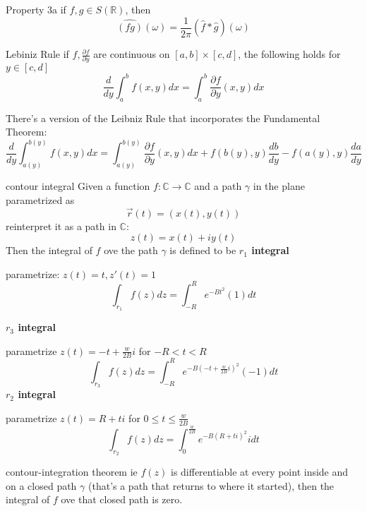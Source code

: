 \documentclass[a4paper]{article}
\newcommand{\C}{\mathbb{C}}
\newcommand{\R}{\mathbb{R}}
\begin{document}
\begin{Corollary}{Property 3a}{}
	if $f,g \in S(\R)$, then \[
		\widehat{\left( fg \right) }\left( \omega \right) = \frac{1}{2\pi}\left( \hat{f} * \hat{g} \right) \left( \omega \right) 
	\] 
\end{Corollary}

\begin{Theorem}{Lebiniz Rule}{}
	if $f, \frac{\partial f}{\partial y}$ are continuous on  $[a,b] \times [c,d]$, the following holds for  $y \in [c,d]$ \[
	\frac{d}{d y} \int_{a}^{b} f(x, y) d x=\int_{a}^{b} \frac{\partial f}{\partial y}(x, y) d x
	\] 
\end{Theorem}

There's a version of the Leibniz Rule that incorporates the Fundamental Theorem: \[
	\frac{d}{dy} \int_{a(y)}^{b(y)} f(x,y) dx = \int_{a(y)}^{b(y)} \frac{\partial f}{\partial y} (x,y) dx + f(b(y),y) \frac{db}{dy}- f(a(y),y)\frac{da}{dy}
\] 
\begin{Definition}{contour integral}{}
	Given a function $f: \C \to  \C$ and a path $\gamma$ in the plane parametrized as  \[
	\vec{r}(t)=(x(t), y(t))
	\] reinterpret it as a path in $\C$:  \[
	z(t) = x(t) + iy(t)
	\] Then the integral of $f$ ove the path  $\gamma$ is defined to be 
\tcblower
\textbf{$r_1$ integral}

parametrize: $z(t) = t, z'(t) = 1$
	\[
	\int_{r_1} f(z) dz = \int_{-R}^{R} e ^{-Bt^2} (1) dt
	\] 

\textbf{$r_3$ integral}

parametrize $z(t) = -t + \frac{w}{2B} i$ for $-R <t <R$
 \[
	 \int_{r_3} f(z) dz = \int_{-R}^R e^{-B(-t + \frac{w}{2B}i)^2 }(-1) dt 
\] 
\textbf{$r_2$ integral}

parametrize $z(t) = R+ti$ for  $0 \le t \le  \frac{w}{2B}$ 
\[
	\int_{r_2} f(z) dz = \int_0^{\frac{w}{2B}} e^{-B(R+ti)^2} i dt
\]
\end{Definition}


\begin{Theorem}{contour-integration theorem}
	ie $f(z)$ is differentiable at every point inside and on a closed path  $\gamma$ (that's a path that returns to where it started), then the integral of  $f$ ove that closed path is zero.
\end{Theorem} 
\end{document}
